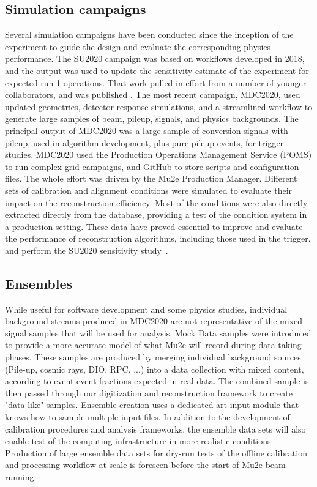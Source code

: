 \subsection{Simulation campaigns}
Several simulation campaigns have been conducted since the inception of the experiment to guide the design and evaluate the corresponding physics performance. The SU2020 campaign was based on workflows developed in 2018, and the output was used to update the sensitivity estimate of the experiment for expected run 1 operations. That work pulled in effort from a number of younger collaborators, and was published \cite{Mu2e:2022ggl}.  The most recent campaign, MDC2020, used updated geometries, detector response simulations, and a streamlined workflow to generate
large samples of beam, pileup, signals, and physics backgrounds. The principal output of MDC2020 was a large sample of conversion signals with pileup, used in algorithm development, plus pure pileup events, for trigger studies.
MDC2020 used the Production Operations Management Service (POMS) to run complex grid campaigns, and GitHub to store scripts and configuration files. The whole effort was driven by the Mu2e Production Manager. 
Different sets of calibration and alignment conditions were simulated to evaluate their impact on the reconstruction efficiency. Most of the conditions were also directly extracted directly from the database, providing a test of the condition system in a production setting. These data have proved essential to improve and evaluate the performance of reconstruction algorithms, including those used in the trigger, and perform the SU2020 sensitivity study~\cite{Mu2e:2022ggl}. 

\subsection{Ensembles}
\label{subsec:ensembles}
While useful for software development and some physics studies, individual background streams produced in MDC2020 are not representative of the mixed-signal samples that will be used for analysis. Mock Data samples were introduced to provide a more accurate model of what Mu2e will record during data-taking phases. These samples are produced by merging individual background sources (Pile-up, cosmic rays, DIO, RPC, ...) into a data collection with mixed content, according to event event fractions expected in real data. The combined sample is then passed through our digitization and reconstruction framework to create "data-like" samples. Ensemble creation uses a dedicated art input module that knows how to sample multiple input files. In addition to the development of calibration procedures and analysis frameworks, the ensemble data sets will also enable test of the computing infrastructure in more realistic conditions. Production of large ensemble data sets for dry-run tests of the offline calibration and processing workflow at scale is foreseen before the start of Mu2e beam running.